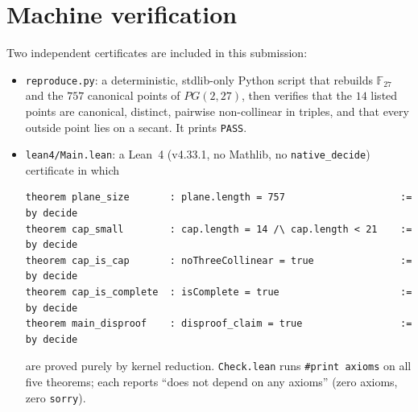 \documentclass[11pt]{article}
\begin{document}
\section{Machine verification}

Two independent certificates are included in this submission:

\begin{itemize}
\item \texttt{reproduce.py}: a deterministic, stdlib-only Python script that rebuilds $\mathbb{F}_{27}$ and the $757$ canonical points of $PG(2,27)$, then verifies that the $14$ listed points are canonical, distinct, pairwise non-collinear in triples, and that every outside point lies on a secant. It prints \texttt{PASS}.
\item \texttt{lean4/Main.lean}: a Lean~4 (v4.33.1, no Mathlib, no \texttt{native\_decide}) certificate in which
\begin{verbatim}
theorem plane_size       : plane.length = 757                    := by decide
theorem cap_small        : cap.length = 14 /\ cap.length < 21    := by decide
theorem cap_is_cap       : noThreeCollinear = true               := by decide
theorem cap_is_complete  : isComplete = true                     := by decide
theorem main_disproof    : disproof_claim = true                 := by decide
\end{verbatim}
are proved purely by kernel reduction. \texttt{Check.lean} runs \texttt{\#print axioms} on all five theorems; each reports ``does not depend on any axioms'' (zero axioms, zero \texttt{sorry}).
\end{itemize}
\end{document}
